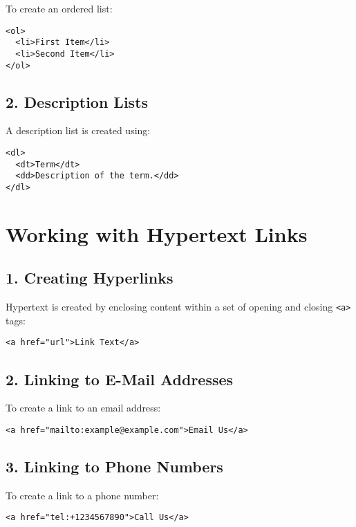 \documentclass{article}
\begin{document}
To create an ordered list:
\begin{lstlisting}
<ol>
  <li>First Item</li>
  <li>Second Item</li>
</ol>
\end{lstlisting}

\subsection*{2. Description Lists}
A description list is created using:
\begin{lstlisting}
<dl>
  <dt>Term</dt>
  <dd>Description of the term.</dd>
</dl>
\end{lstlisting}

\section{Working with Hypertext Links}
\subsection*{1. Creating Hyperlinks}
Hypertext is created by enclosing content within a set of opening and closing \texttt{<a>} tags:
\begin{lstlisting}
<a href="url">Link Text</a>
\end{lstlisting}

\subsection*{2. Linking to E-Mail Addresses}
To create a link to an email address:
\begin{lstlisting}
<a href="mailto:example@example.com">Email Us</a>
\end{lstlisting}

\subsection*{3. Linking to Phone Numbers}
To create a link to a phone number:
\begin{lstlisting}
<a href="tel:+1234567890">Call Us</a>
\end{lstlisting}
\end{document}
